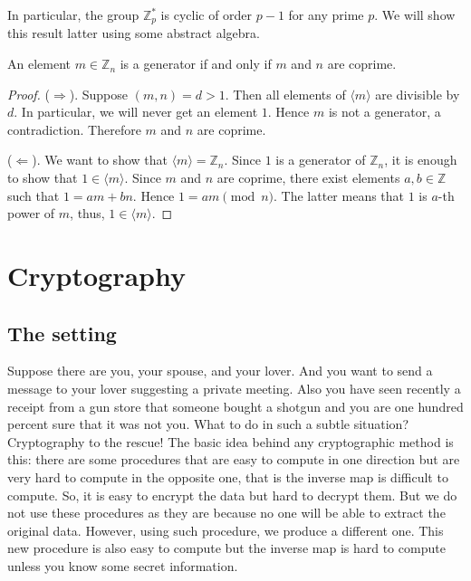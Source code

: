 In particular, the group $\mathbb Z_p^*$ is cyclic of order $p-1$ for any prime $p$. We will show this result latter using some abstract algebra.

\begin{claim}
An element $m\in \mathbb Z_n$ is a generator if and only if $m$ and $n$ are coprime.
\end{claim}
\begin{proof}
($\Rightarrow$). Suppose $(m, n) = d > 1$. Then all elements of $\langle m\rangle$ are divisible by $d$. In particular, we will never get an element $1$. Hence $m$ is not a generator, a contradiction. Therefore $m$ and $n$ are coprime.

($\Leftarrow$). We want to show that $\langle m\rangle = \mathbb Z_n$. Since $1$ is a generator of $\mathbb Z_n$, it is enough to show that $1\in \langle m\rangle$. Since $m$ and $n$ are coprime, there exist elements $a, b\in \mathbb Z$ such that $1 = a m + b n$. Hence $1 = a m \pmod n$. The latter means that $1$ is $a$-th power of $m$, thus, $1 \in \langle m \rangle$.
\end{proof}


\section{Cryptography}

\subsection{The setting}

Suppose there are you, your spouse, and your lover. And you want to send a message to your lover suggesting a private meeting. Also you have seen recently a receipt from a gun store that someone bought a shotgun and you are one hundred percent sure that it was not you. What to do in such a subtle situation? Cryptography to the rescue! The basic idea behind any cryptographic method is this: there are some procedures that are easy to compute in one direction but are very hard to compute in the opposite one, that is the inverse map is difficult to compute. So, it is easy to encrypt the data but hard to decrypt them. But we do not use these procedures as they are because no one will be able to extract the original data. However, using such procedure, we produce a different one. This new procedure is also easy to compute but the inverse map is hard to compute unless you know some secret information. 

